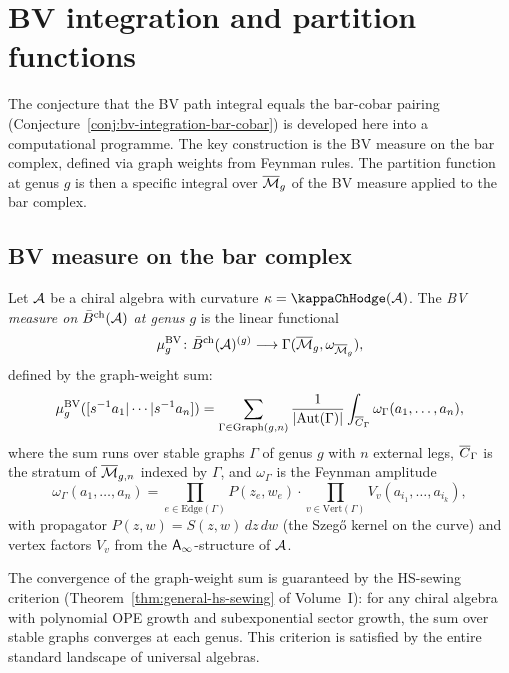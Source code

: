 \section{BV integration and partition functions}

The conjecture that the BV path integral equals the bar-cobar pairing
(Conjecture~\ref{conj:bv-integration-bar-cobar}) is developed here into
a computational programme. The key construction is the BV measure on
the bar complex, defined via graph weights from Feynman rules. The
partition function at genus $g$ is then a specific integral over
$\overline{\mathcal{M}}_g$ of the BV measure applied to the bar complex.

\subsection{BV measure on the bar complex}

\begin{definition}
Let $\mathcal{A}$ be a chiral algebra with curvature $\kappa = \kappaChHodge(\cA)$.
The \emph{BV measure on $\bar{B}^{\mathrm{ch}}(\mathcal{A})$ at genus $g$} is the linear
functional
\[
\mu^{\mathrm{BV}}_g \colon
 \bar{B}^{\mathrm{ch}}(\mathcal{A})^{(g)} \longrightarrow
 \Gamma(\overline{\mathcal{M}}_g, \omega_{\overline{\mathcal{M}}_g}),
\]
defined by the graph-weight sum:
\[
\mu^{\mathrm{BV}}_g([s^{-1}a_1 | \cdots | s^{-1}a_n])
 = \sum_{\Gamma \in \mathrm{Graph}(g,n)}
 \frac{1}{|\mathrm{Aut}(\Gamma)|}
 \int_{\overline{C}_{\Gamma}} \omega_\Gamma(a_1, \ldots, a_n),
\]
where the sum runs over stable graphs $\Gamma$ of genus $g$ with $n$
external legs, $\overline{C}_\Gamma$ is the stratum of $\overline{\mathcal{M}}_{g,n}$
indexed by $\Gamma$, and $\omega_\Gamma$ is the Feynman amplitude
\[
\omega_\Gamma(a_1, \ldots, a_n)
 = \prod_{e \in \mathrm{Edge}(\Gamma)} P(z_e, w_e)
 \cdot \prod_{v \in \mathrm{Vert}(\Gamma)} V_v(a_{i_1}, \ldots, a_{i_k}),
\]
with propagator $P(z, w) = S(z, w) \, dz \, dw$ (the Szeg\H{o}
kernel on the curve) and vertex factors $V_v$ from the $\mathsf{A}_{\infty}$-structure
of $\mathcal{A}$.
\end{definition}

\begin{remark}[Convergence]
The convergence of the graph-weight sum is guaranteed by the HS-sewing
criterion (Theorem~\ref*{thm:general-hs-sewing} of Volume~I): for any
chiral algebra with polynomial OPE growth and subexponential sector
growth, the sum over stable graphs converges at each genus. This
criterion is satisfied by the entire standard landscape of
universal algebras.
\end{remark}

